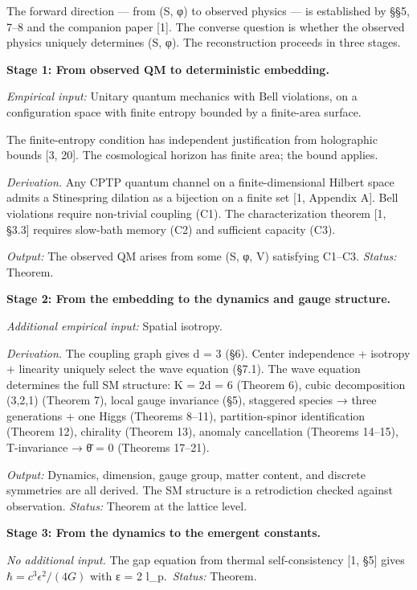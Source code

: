 \documentclass[
  11pt,
]{article}
\begin{document}
The forward direction --- from (S, φ) to observed physics --- is
established by §§5, 7--8 and the companion paper {[}1{]}. The converse
question is whether the observed physics uniquely determines (S, φ). The
reconstruction proceeds in three stages.

\textbf{Stage 1: From observed QM to deterministic embedding.}

\emph{Empirical input:} Unitary quantum mechanics with Bell violations,
on a configuration space with finite entropy bounded by a finite-area
surface.

The finite-entropy condition has independent justification from
holographic bounds {[}3, 20{]}. The cosmological horizon has finite
area; the bound applies.

\emph{Derivation.} Any CPTP quantum channel on a finite-dimensional
Hilbert space admits a Stinespring dilation as a bijection on a finite
set {[}1, Appendix A{]}. Bell violations require non-trivial coupling
(C1). The characterization theorem {[}1, §3.3{]} requires slow-bath
memory (C2) and sufficient capacity (C3).

\emph{Output:} The observed QM arises from some (S, φ, V) satisfying
C1--C3. \emph{Status:} Theorem.

\textbf{Stage 2: From the embedding to the dynamics and gauge
structure.}

\emph{Additional empirical input:} Spatial isotropy.

\emph{Derivation.} The coupling graph gives d = 3 (§6). Center
independence + isotropy + linearity uniquely select the wave equation
(§7.1). The wave equation determines the full SM structure: K = 2d = 6
(Theorem 6), cubic decomposition (3,2,1) (Theorem 7), local gauge
invariance (§5), staggered species → three generations + one Higgs
(Theorems 8--11), partition-spinor identification (Theorem 12),
chirality (Theorem 13), anomaly cancellation (Theorems 14--15),
T-invariance → θ̄ = 0 (Theorems 17--21).

\emph{Output:} Dynamics, dimension, gauge group, matter content, and
discrete symmetries are all derived. The SM structure is a retrodiction
checked against observation. \emph{Status:} Theorem at the lattice
level.

\textbf{Stage 3: From the dynamics to the emergent constants.}

\emph{No additional input.} The gap equation from thermal
self-consistency {[}1, §5{]} gives \(\hbar = c^3 \epsilon^2 / (4G)\)
with ε = 2 l\_p.~\emph{Status:} Theorem.
\end{document}
